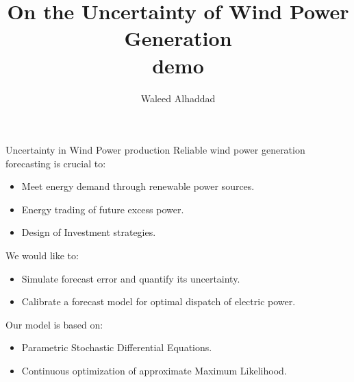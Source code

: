 \documentclass[aspectratio=169]{beamer}\usepackage[utf8]{inputenc}
\title{On the Uncertainty of Wind Power Generation\\ demo}
\subtitle{ Waleed Alhaddad}
\begin{document}


\begin{frame}{Uncertainty in Wind Power production}
Reliable wind power generation forecasting is crucial to:
\begin{itemize}
\item  Meet energy demand through renewable power sources.
\item  Energy trading of future excess power.
\item Design of Investment strategies.
\end{itemize}
We would like to:
\begin{itemize}
\item  Simulate forecast error and quantify its uncertainty.
\item  Calibrate a forecast model for  optimal dispatch of electric power.
\end{itemize}
Our model is based on:
\begin{itemize}
\item Parametric Stochastic Differential Equations.
\item Continuous optimization of approximate Maximum Likelihood.
\end{itemize}
\end{frame}
\end{document}
